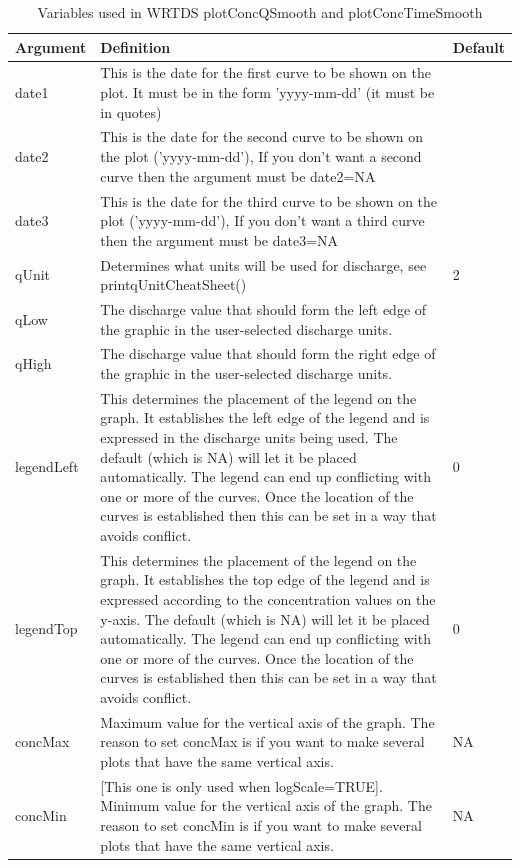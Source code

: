 \documentclass[a4paper,11pt]{article}\usepackage[]{graphicx}\usepackage[]{color}
\begin{document}
\begin{table}[ht]
\caption{Variables used in WRTDS plotConcQSmooth and plotConcTimeSmooth \label{tab:wrtdsMultiVariables}}
\begin{tabularx}{\textwidth}{lXl}
\hline
  \textbf{Argument} & \textbf{Definition} & \textbf{Default}\\
\hline
date1 & This is the date for the first curve to be shown on the plot.  It must be in the form 'yyyy-mm-dd' (it must be in quotes) &\\
date2 & This is the date for the second curve to be shown on the plot ('yyyy-mm-dd'), If you don't want a second curve then the argument must be date2=NA &\\
date3 & This is the date for the third curve to be shown on the plot ('yyyy-mm-dd'), If you don't want a third curve then the argument must be date3=NA &\\
qUnit & Determines what units will be used for discharge, see printqUnitCheatSheet() & 2\\
qLow & The discharge value that should form the left edge of the graphic in the user-selected discharge units. & \\
qHigh & The discharge value that should form the right edge of the graphic in the user-selected discharge units. & \\
legendLeft & This determines the placement of the legend on the graph.  It establishes the left edge of the legend and is expressed in the discharge units being used.  The default (which is NA) will let it be placed automatically.  The legend can end up conflicting with one or more of the curves.  Once the location of the curves is established then this can be set in a way that avoids conflict. & 0\\
legendTop & This determines the placement of the legend on the graph.  It establishes the top edge of the legend and is expressed according to the concentration values on the y-axis.  The default (which is NA) will let it be placed automatically.  The legend can end up conflicting with one or more of the curves.  Once the location of the curves is established then this can be set in a way that avoids conflict. & 0\\
concMax & Maximum value for the vertical axis of the graph.  The reason to set concMax is if you want to make several plots that have the same vertical axis. & NA\\
concMin & [This one is only used when logScale=TRUE].  Minimum value for the vertical axis of the graph. The reason to set concMin is if you want to make several plots that have the same vertical axis. & NA\\

\end{tabularx}
\end{table}
\end{document}
